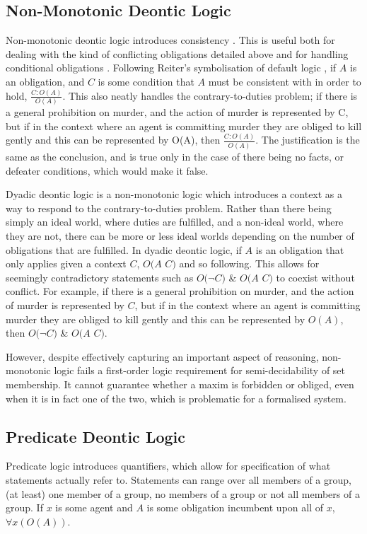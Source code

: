 \documentclass{l4proj}
\begin{document}
\subsection{Non-Monotonic Deontic Logic}
Non-monotonic deontic logic introduces consistency \cite{Powers}. This is useful both for dealing with the kind of conflicting obligations detailed above and for handling conditional obligations \cite{Horty}. Following Reiter's symbolisation of default logic \cite{Reiter}, if $A$ is an obligation, and $C$ is some condition that $A$ must be consistent with in order to hold, \( \frac{C : O(A)}{O(A)} \). This also neatly handles the contrary-to-duties problem; if there is a general prohibition on murder, and the action of murder is represented by C, but if in the context where an agent is committing murder they are obliged to kill gently and this can be represented by O(A), then \( \frac{C : O(A)}{O(A)} \). The justification is the same as the conclusion, and is true only in the case of there being no facts, or defeater conditions, which would make it false. 

Dyadic deontic logic is a non-monotonic logic which introduces a context as a way to respond to the contrary-to-duties problem. Rather than there being simply an ideal world, where duties are fulfilled, and a non-ideal world, where they are not, there can be more or less ideal worlds depending on the number of obligations that are fulfilled. In dyadic deontic logic, if $A$ is an obligation that only applies given a context $C$, $O(A$ \textbar $C)$ and so following. This allows for seemingly contradictory statements such as $O($\( \neg \)$C)$ \& $O(A$ \textbar $C)$ to coexist without conflict. For example, if there is a general prohibition on murder, and the action of murder is represented by $C$, but if in the context where an agent is committing murder they are obliged to kill gently and this can be represented by $O(A)$, then $O($\( \neg \)$C)$ \& $O(A$ \textbar $C)$. 

However, despite effectively capturing an important aspect of reasoning, non-monotonic logic fails a first-order logic requirement for semi-decidability of set membership. It cannot guarantee whether a maxim is forbidden or obliged, even when it is in fact one of the two, which is problematic for a formalised system. 

\subsection{Predicate Deontic Logic}
Predicate logic introduces quantifiers, which allow for specification of what statements actually refer to. Statements can range over all members of a group, (at least) one member of a group, no members of a group or not all members of a group. If $x$ is some agent and $A$ is some obligation incumbent upon all of $x$, \( \forall{x(O(A))} \). 
\end{document}
